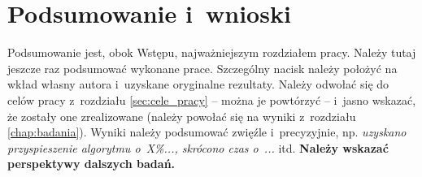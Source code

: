 \chapter{Podsumowanie i~wnioski}\label{chap:podsumowanie}
Podsumowanie jest, obok Wstępu, najważniejszym rozdziałem pracy. Należy tutaj jeszcze raz podsumować wykonane prace. Szczególny nacisk należy położyć na wkład własny autora i~uzyskane oryginalne rezultaty. Należy odwołać się do celów pracy z~rozdziału \ref{sec:cele_pracy} -- można je powtórzyć -- i~jasno wskazać, że zostały one zrealizowane (należy powołać się na wyniki z~rozdziału \ref{chap:badania}). Wyniki należy podsumować zwięźle i~precyzyjnie, np. \textit{uzyskano przyspieszenie algorytmu o~X\%..., skrócono czas o~...} itd. \textbf{Należy wskazać perspektywy dalszych badań.}

